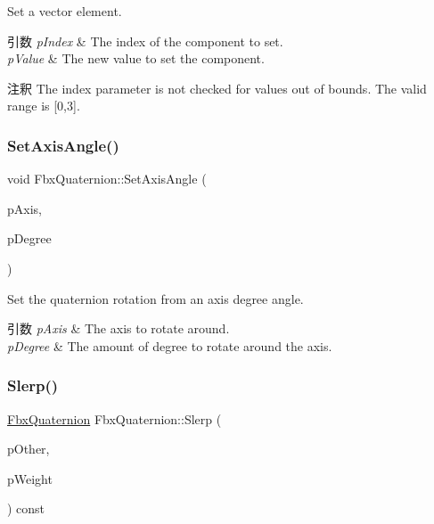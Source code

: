 Set a vector element. 
\begin{DoxyParams}{引数}
{\em p\+Index} & The index of the component to set. \\
\hline
{\em p\+Value} & The new value to set the component. \\
\hline
\end{DoxyParams}
\begin{DoxyRemark}{注釈}
The index parameter is not checked for values out of bounds. The valid range is \mbox{[}0,3\mbox{]}. 
\end{DoxyRemark}
\mbox{\label{class_fbx_quaternion_ad926d8c6abbed994f0474a4144e4f4ea}} 
\subsubsection{\texorpdfstring{Set\+Axis\+Angle()}{SetAxisAngle()}}
{\footnotesize\ttfamily void Fbx\+Quaternion\+::\+Set\+Axis\+Angle (\begin{DoxyParamCaption}\item[{const \hyperlink{class_fbx_vector4}{Fbx\+Vector4} \&}]{p\+Axis,  }\item[{double}]{p\+Degree }\end{DoxyParamCaption})}

Set the quaternion rotation from an axis degree angle. 
\begin{DoxyParams}{引数}
{\em p\+Axis} & The axis to rotate around. \\
\hline
{\em p\+Degree} & The amount of degree to rotate around the axis. \\
\hline
\end{DoxyParams}
\mbox{\label{class_fbx_quaternion_a617ad81c400bdd90745d22ee0b0b42bc}} 
\subsubsection{\texorpdfstring{Slerp()}{Slerp()}}
{\footnotesize\ttfamily \hyperlink{class_fbx_quaternion}{Fbx\+Quaternion} Fbx\+Quaternion\+::\+Slerp (\begin{DoxyParamCaption}\item[{const \hyperlink{class_fbx_quaternion}{Fbx\+Quaternion} \&}]{p\+Other,  }\item[{double}]{p\+Weight }\end{DoxyParamCaption}) const}

